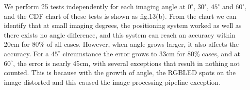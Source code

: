 \documentclass[conference]{IEEEtran}
\begin{document}
We perform 25 tests independently for each imaging angle at  $0^{\circ}$,  $30^{\circ}$,  $45^{\circ}$ and  $60^{\circ}$, and the CDF chart of these tests is shown as fig.13(b). From the chart we can identify that at small imaging degrees, the positioning system worked as well as there exists no angle difference, and this system can reach an accuracy within 20cm for 80\% of all cases. However, when angle grows larger, it also affects the accuracy. For a $45^{\circ}$ circumstance the error grows to 33cm for 80\% cases, and at $60^{\circ}$, the error is nearly 45cm, with several exceptions that result in nothing not counted. This is because with the growth of angle, the RGBLED spots on the image distorted and this caused the image processing pipeline exception.

\begin{figure}
	\footnotesize
\end{figure}
\end{document}
